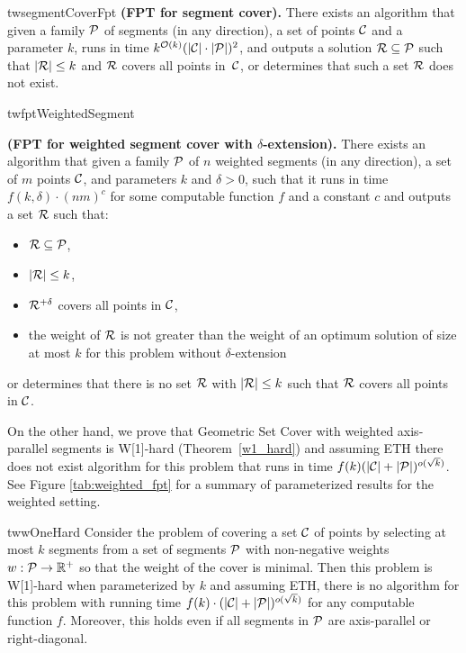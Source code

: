 \begin{restatable}{tw}{segmentCoverFpt}{
	\label{segment_cover_fpt}
	\textbf{(FPT for segment cover).}
	There exists an algorithm that given a family $\mathcal{P}$ of
	segments (in any direction),
	a set of points $\mathcal{C}$
	and a parameter $k$,
	runs in time ${k^{\mathcal{O}(k)} (|\mathcal{C}|\cdot|\mathcal{P}|)^2}$,
	and outputs a solution $\mathcal{R} \subseteq \mathcal{P}$
	such that $|\mathcal{R}| \le k$ and $\mathcal{R}$ covers all points in~$\mathcal{C}$,
	or determines that such a set $\mathcal{R}$ does not exist.
}\end{restatable}

\begin{restatable}{tw}{fptWeightedSegment}{
	\label{fpt_weighted_segment}
	\textbf{(FPT for weighted segment cover with $\delta$-extension).}
	There exists an algorithm that given a family $\mathcal{P}$ of
	$n$ weighted segments (in any direction),
	a set of $m$ points $\mathcal{C}$, and parameters $k$ and $\delta > 0$,
	such that it
	runs in time $f(k, \delta) \cdot (nm)^c$ for some computable function $f$ and a constant $c$ and
	outputs a set $\mathcal{R}$ such that:
	\begin{itemize}
	\item $\mathcal{R} \subseteq \mathcal{P}$,
	\item $|\mathcal{R}| \le k$,
	\item $\mathcal{R}^{+\delta}$ covers all points in $\mathcal{C}$,
	\item the weight of $\mathcal{R}$ is not greater than the weight
	of an optimum solution of size at most $k$
	for this problem without $\delta$-extension
	\end{itemize}
	or determines that there is no set $\mathcal{R}$ with $|\mathcal{R}| \le k$
	such that $\mathcal{R}$ covers all points in $\mathcal{C}$.
}\end{restatable}

On the other hand, we prove that Geometric Set Cover with weighted
axis-parallel segments is W[1]-hard (Theorem~\ref{w1_hard})
and assuming ETH there does not exist algorithm for this problem
that runs in time ${f(k)(|\mathcal{C}| + |\mathcal{P}|)^{o(\sqrt{k})}}$.
See Figure \ref{tab:weighted_fpt} for a summary of parameterized
results for the weighted setting.

\begin{restatable}{tw}{wOneHard}
\label{w1_hard}
	Consider the problem of covering a set $\mathcal{C}$ of points
	by selecting at most $k$ segments
	from a set of segments $\mathcal{P}$ 
	with non-negative weights $w : \mathcal{P} \rightarrow \mathbb{R^+}$
	so that the weight of the cover is minimal.
	Then this problem is W[1]-hard when parameterized by $k$ and
	assuming ETH, there is no algorithm for this
	problem with running time
	$f(k)\cdot(|\mathcal{C}| + |\mathcal{P}|)^{o(\sqrt{k})}$
	for any computable function $f$.
	Moreover, this holds even if all segments in $\mathcal{P}$
	are axis-parallel or right-diagonal.
\end{restatable}

